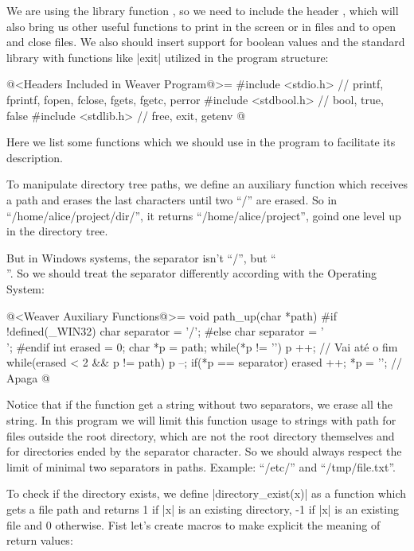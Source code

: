 We are using the library function , so we need to
include the header , which will also bring us
other useful functions to print in the screen or in files and to open
and close files. We also should insert support for boolean values and
the standard library with functions like |exit| utilized in the
program structure:

\iniciocodigo
@<Headers Included in Weaver Program@>=
#include <stdio.h> // printf, fprintf, fopen, fclose, fgets, fgetc, perror
#include <stdbool.h> // bool, true, false
#include <stdlib.h> // free, exit, getenv
@
\fimcodigo


Here we list some functions which we should use in the program to
facilitate its description.


To manipulate directory tree paths, we define an auxiliary function
which receives a path and erases the last characters until two ``/''
are erased. So in ``/home/alice/project/dir/'', it returns
``/home/alice/project'', goind one level up in the directory tree.

But in Windows systems, the separator isn't ``/'', but ``\\''. So we
should treat the separator differently according with the Operating
System:

\iniciocodigo
@<Weaver Auxiliary Functions@>=
void path_up(char *path){
#if !defined(_WIN32)
  char separator = '/';
#else
  char separator = '\\';
#endif
  int erased = 0;
  char *p = path;
  while(*p != '\0') p ++; // Vai até o fim
  while(erased < 2 && p != path){
    p --;
    if(*p == separator) erased ++;
    *p = '\0'; // Apaga
  }
}
@
\fimcodigo

Notice that if the function get a string without two separators, we
erase all the string. In this program we will limit this function
usage to strings with path for files outside the root directory, which
are not the root directory themselves and for directories ended by the
separator character. So we should always respect the limit of minimal
two separators in paths. Example: ``/etc/'' and ``/tmp/file.txt''.


To check if the directory  exists, we define
|directory_exist(x)| as a function which gets a file path and returns
1 if |x| is an existing directory, -1 if |x| is an existing file and 0
otherwise. Fist let's create macros to make explicit the meaning of
return values:

